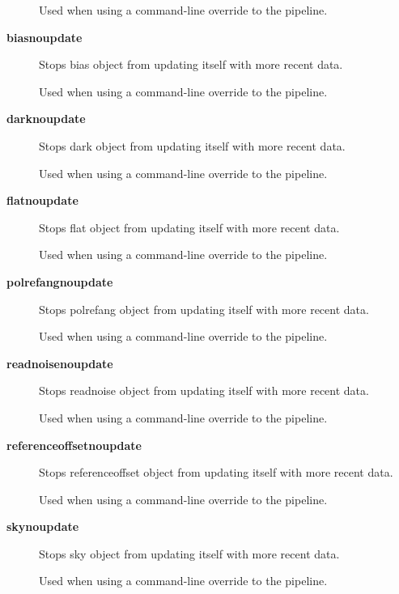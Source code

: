 \begin{description}
Used when using a command-line override to the pipeline.


\item[\textbf{biasnoupdate}] \mbox{}

Stops bias object from updating itself with more recent data.



Used when using a command-line override to the pipeline.


\item[\textbf{darknoupdate}] \mbox{}

Stops dark object from updating itself with more recent data.



Used when using a command-line override to the pipeline.


\item[\textbf{flatnoupdate}] \mbox{}

Stops flat object from updating itself with more recent data.



Used when using a command-line override to the pipeline.


\item[\textbf{polrefangnoupdate}] \mbox{}

Stops polrefang object from updating itself with more recent data.



Used when using a command-line override to the pipeline.


\item[\textbf{readnoisenoupdate}] \mbox{}

Stops readnoise object from updating itself with more recent data.



Used when using a command-line override to the pipeline.


\item[\textbf{referenceoffsetnoupdate}] \mbox{}

Stops referenceoffset object from updating itself with more recent data.



Used when using a command-line override to the pipeline.


\item[\textbf{skynoupdate}] \mbox{}

Stops sky object from updating itself with more recent data.



Used when using a command-line override to the pipeline.



\end{description}

